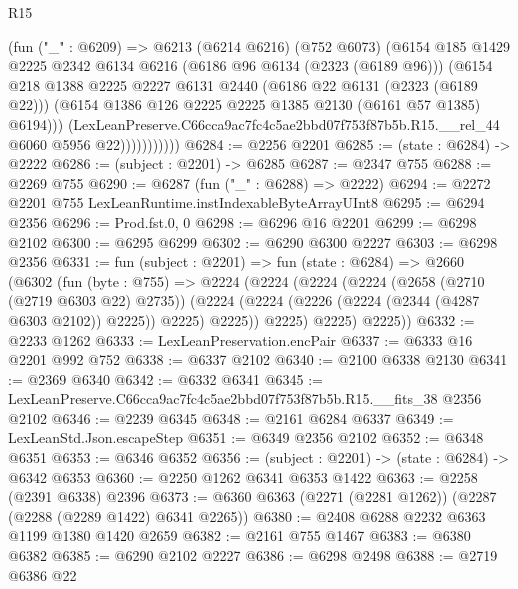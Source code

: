 \begin{lexlean}{R15}
\begin{coremodule}
                      (fun ("_" : @6209) =>
                      @6213
                        (@6214 @6216)
                        (@752 @6073)
                        (@6154
                          @185
                          @1429
                          @2225
                          @2342
                          @6134
                          @6216
                          (@6186 @96 @6134 (@2323 (@6189 @96)))
                          (@6154
                            @218
                            @1388
                            @2225
                            @2227
                            @6131
                            @2440
                            (@6186 @22 @6131 (@2323 (@6189 @22)))
                            (@6154 @1386 @126 @2225 @2225 @1385 @2130 (@6161 @57 @1385) @6194)))
                        (LexLeanPreserve.C66cca9ac7fc4c5ae2bbd07f753f87b5b.R15.__rel_44
                          @6060
                          @5956
                          @22)))))))))))
@6284 := @2256 @2201
@6285 := (state : @6284) -> @2222
@6286 := (subject : @2201) -> @6285
@6287 := @2347 @755
@6288 := @2269 @755
@6290 := @6287 (fun ("_" : @6288) => @2222)
@6294 := @2272 @2201 @755 LexLeanRuntime.instIndexableByteArrayUInt8
@6295 := @6294 @2356
@6296 := Prod.fst.{0, 0}
@6298 := @6296 @16 @2201
@6299 := @6298 @2102
@6300 := @6295 @6299
@6302 := @6290 @6300 @2227
@6303 := @6298 @2356
@6331 := fun (subject : @2201) =>
  fun (state : @6284) =>
  @2660
    (@6302
      (fun (byte : @755) =>
      @2224
        (@2224
          (@2224
            (@2224
              (@2658 (@2710 (@2719 @6303 @22) @2735))
              (@2224 (@2224 (@2226 (@2224 (@2344 (@4287 @6303 @2102)) @2225)) @2225) @2225))
            @2225)
          @2225)
        @2225))
@6332 := @2233 @1262
@6333 := LexLeanPreservation.encPair
@6337 := @6333 @16 @2201 @992 @752
@6338 := @6337 @2102
@6340 := @2100 @6338 @2130
@6341 := @2369 @6340
@6342 := @6332 @6341
@6345 := LexLeanPreserve.C66cca9ac7fc4c5ae2bbd07f753f87b5b.R15.__fits_38 @2356 @2102
@6346 := @2239 @6345
@6348 := @2161 @6284 @6337
@6349 := LexLeanStd.Json.escapeStep
@6351 := @6349 @2356 @2102
@6352 := @6348 @6351
@6353 := @6346 @6352
@6356 := (subject : @2201) -> (state : @6284) -> @6342 @6353
@6360 := @2250 @1262 @6341 @6353 @1422
@6363 := @2258 (@2391 @6338) @2396
@6373 := @6360 @6363 (@2271 (@2281 @1262)) (@2287 (@2288 (@2289 @1422) @6341 @2265))
@6380 := @2408 @6288 @2232 @6363 @1199 @1380 @1420 @2659
@6382 := @2161 @755 @1467
@6383 := @6380 @6382
@6385 := @6290 @2102 @2227
@6386 := @6298 @2498
@6388 := @2719 @6386 @22

\end{coremodule}
\end{lexlean}
